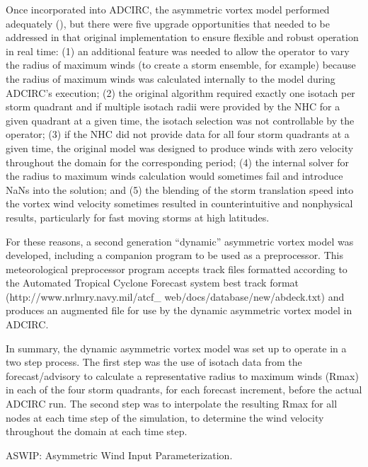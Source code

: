 \documentclass[jmse,article,submit,moreauthors,pdftex,12pt,a4paper]{mdpi}
\begin{document}
Once incorporated into ADCIRC, the asymmetric vortex model performed 
adequately (\cite{ForbesC2010}), but there were five upgrade 
opportunities that needed to be addressed in that original 
implementation to ensure flexible and robust operation in real time: 
(1) an additional feature was needed to allow the operator to vary 
the radius of maximum winds (to create a storm ensemble, for 
example) because the radius of maximum winds was calculated 
internally to the model during ADCIRC's execution; (2) the original 
algorithm required exactly one isotach per storm quadrant and if 
multiple isotach radii were provided by the NHC for a given quadrant 
at a given time, the isotach selection was not controllable by the 
operator; (3) if the NHC did not provide data for all four storm 
quadrants at a given time, the original model was designed to 
produce winds with zero velocity throughout the domain for the 
corresponding period; (4) the internal solver for the radius to 
maximum winds calculation would sometimes fail and introduce NaNs 
into the solution; and (5) the blending of the storm translation 
speed into the vortex wind velocity sometimes resulted in 
counterintuitive and nonphysical results, particularly for fast 
moving storms at high latitudes.

For these reasons, a second generation ``dynamic'' asymmetric vortex 
model was developed, including a companion program to be used as a 
preprocessor. This meteorological preprocessor program accepts track 
files formatted according to the Automated Tropical Cyclone Forecast 
system best track format (http://www.nrlmry.navy.mil/atcf\_ 
web/docs/database/new/abdeck.txt) and produces an augmented file for 
use by the dynamic asymmetric vortex model in ADCIRC. 

In summary, the dynamic asymmetric vortex model was set up to 
operate in a two step process. The first step was the use of isotach 
data from the forecast/advisory to calculate a representative radius 
to maximum winds (Rmax) in each of the four storm quadrants, for 
each forecast increment, before the actual ADCIRC run. The second 
step was to interpolate the resulting Rmax for all nodes at each 
time step of the simulation, to determine the wind velocity 
throughout the domain at each time step.

ASWIP: Asymmetric Wind Input Parameterization.
\end{document}
